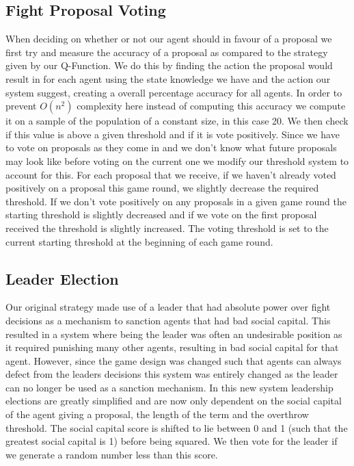 \subsection{Fight Proposal Voting}

When deciding on whether or not our agent should in favour of a proposal we first try and measure the accuracy of a proposal as compared to the strategy given by our Q-Function. We do this by finding the action the proposal would result in for each agent using the state knowledge we have and the action our system suggest, creating a overall percentage accuracy for all agents. In order to prevent $O(n^2)$ complexity here instead of computing this accuracy we compute it on a sample of the population of a constant size, in this case 20.  We then check if this value is above a given threshold and if it is vote positively. Since we have to vote on proposals as they come in and we don't know what future proposals may look like before voting on the current one we modify our threshold system to account for this. For each proposal that we receive, if we haven't already voted positively on a proposal this game round, we slightly decrease the required threshold. If we don't vote positively on any proposals in a given game round the starting threshold is slightly decreased and if we vote on the first proposal received the threshold is slightly increased. The voting threshold is set to the current starting threshold at the beginning of each game round.

\subsection{Leader Election}

Our original strategy made use of a leader that had absolute power over fight decisions as a mechanism to sanction agents that had bad social capital. This resulted in a system where being the leader was often an undesirable position as it required punishing many other agents, resulting in bad social capital for that agent. However, since the game design was changed such that agents can always defect from the leaders decisions this system was entirely changed as the leader can no longer be used as a sanction mechanism. In this new system leadership elections are greatly simplified and are now only dependent on the social capital of the agent giving a proposal, the length of the term and the overthrow threshold. The social capital score is shifted to lie between 0 and 1 (such that the greatest social capital is 1) before being squared. We then vote for the leader if we generate a random number less than this score.

